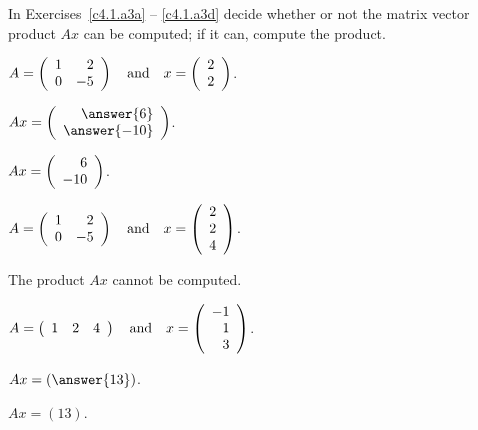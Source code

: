 \documentclass{ximera}
\begin{document}
\noindent In Exercises~\ref{c4.1.a3a} -- \ref{c4.1.a3d} decide whether or
not the matrix vector product $Ax$ can be computed; if it can, compute the
product.
\begin{exercise} \label{c4.1.a3a}
  $A=\left(\begin{array}{rr} 1 & 2\\ 0 &-5\end{array}\right) \quad\mbox{and}\quad x = \left(\begin{array}{r} 2 \\ 2\end{array}\right)$.
  \begin{multipleChoice}
  \end{multipleChoice}
  \begin{exercise}
    $Ax = \vectwo{\answer{6}}{\answer{-10}}$.
  \end{exercise}
  
  \begin{solution}
    $Ax = \left(\begin{array}{r} 6 \\ -10\end{array}\right)$.
  \end{solution}

\end{exercise}

\begin{exercise} \label{c4.1.a3b}
$A=\left(\begin{array}{rr} 1 & 2\\ 0 &-5\end{array}\right) \quad\mbox{and}\quad
x = \left(\begin{array}{r} 2\\ 2 \\4\end{array}\right)$.
  \begin{multipleChoice}
  \end{multipleChoice}

  \begin{solution}
    The product $Ax$ cannot be computed.
  \end{solution}
\end{exercise}

\begin{exercise} \label{c4.1.a3c}
$A=\left(\begin{array}{rrr} 1 & 2 & 4 \end{array}\right) \quad\mbox{and}\quad
x = \left(\begin{array}{r} -1\\ 1 \\3\end{array}\right)$.
  \begin{multipleChoice}
  \end{multipleChoice}
  \begin{exercise}
    $Ax = \left(\answer{13}\right)$.
  \end{exercise}
  
  \begin{solution}
    $Ax = \left(13\right)$.
    
  \end{solution}
\end{exercise}
\end{document}
